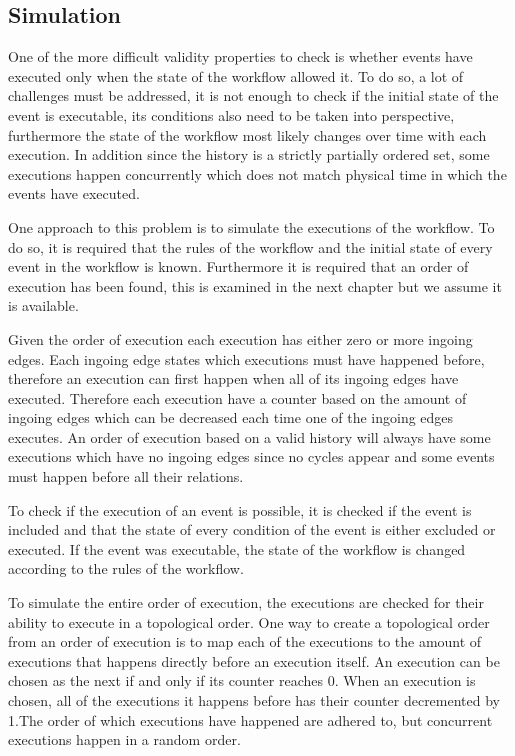     \subsection{Simulation}\label{sec:historyindcr:simulation}
    One of the more difficult validity properties to check is whether events have executed only when the state of the workflow allowed it. To do so, a lot of challenges must be addressed, it is not enough to check if the initial state of the event is executable, its conditions also need to be taken into perspective, furthermore the state of the workflow most likely changes over time with each execution. In addition since the history is a strictly partially ordered set, some executions happen concurrently which does not match physical time in which the events have executed.
    
    \newpar One approach to this problem is to simulate the executions of the workflow. To do so, it is required that the rules of the workflow and the initial state of every event in the workflow is known. Furthermore it is required that an order of execution has been found, this is examined in the next chapter but we assume it is available. 
    
    Given the order of execution each execution has either zero or more ingoing edges. Each ingoing edge states which executions must have happened before, therefore an execution can first happen when all of its ingoing edges have executed. Therefore each execution have a counter based on the amount of ingoing edges which can be decreased each time one of the ingoing edges executes. An order of execution based on a valid history will always have some executions which have no ingoing edges since no cycles appear and some events must happen before all their relations.
    
    \newpar To check if the execution of an event is possible, it is checked if the event is included and that the state of every condition of the event is either excluded or executed. If the event was executable, the state of the workflow is changed according to the rules of the workflow.
    
    \newpar To simulate the entire order of execution, the executions are checked for their ability to execute in a topological order. One way to create a topological order from an order of execution is to map each of the executions to the amount of executions that happens directly before an execution itself. An execution can be chosen as the next if and only if its counter reaches 0. When an execution is chosen, all of the executions it happens before has their counter decremented by 1.The order of which executions have happened are adhered to, but concurrent executions happen in a random order.
    
